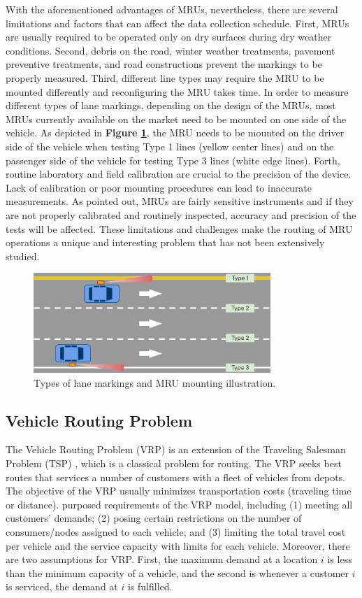 \documentclass[numbered]{trbunofficial}
\begin{document}
With the aforementioned advantages of MRUs, nevertheless, there are several limitations and factors that can affect the data collection schedule.  First, MRUs are usually required to be operated only on dry surfaces during dry weather conditions.  Second, debris on the road, winter weather treatments, pavement preventive treatments, and road constructions prevent the markings to be properly measured.  Third, different line types may require the MRU to be mounted differently and reconfiguring the MRU takes time.  In order to measure different types of lane markings, depending on the design of the MRUs, most MRUs currently available on the market need to be mounted on one side of the vehicle. As depicted in \textbf{Figure \ref{fig:1}}, the MRU needs to be mounted on the driver side of the vehicle when testing Type 1 lines (yellow center lines) and on the passenger side of the vehicle for testing Type 3 lines (white edge lines). Forth, routine laboratory and field calibration are crucial to the precision of the device.  Lack of calibration or poor mounting procedures can lead to inaccurate measurements. As \citep{Choubane2013} pointed out, MRUs are fairly sensitive instruments and if they are not properly calibrated and routinely inspected, accuracy and precision of the tests will be affected. These limitations and challenges make the routing of MRU operations a unique and interesting problem that has not been extensively studied.

\begin{figure}[!ht]
    \centering
    \includegraphics[width=0.8\textwidth]{figures/fig1.png}
    \caption{Types of lane markings and MRU mounting illustration.}
    \label{fig:1}
\end{figure}

\subsection{Vehicle Routing Problem}
The Vehicle Routing Problem (VRP) is an extension of the Traveling Salesman Problem (TSP) \cite{Dantzig2008}, which is a classical problem for routing. The VRP seeks best routes that services a number of customers with a fleet of vehicles from depots. The objective of the VRP usually minimizes transportation costs (traveling time or distance). \citep{Kulkarni1985} purposed requirements of the VRP model, including (1) meeting all customers' demands; (2) posing certain restrictions on the number of consumers/nodes assigned to each vehicle; and (3) limiting the total travel cost per vehicle and the service capacity with limits for each vehicle. Moreover, there are two assumptions for VRP. First, the maximum demand at a location $i$ is less than the minimum capacity of a vehicle, and the second is whenever a customer $i$ is serviced, the demand at $i$ is fulfilled.
\end{document}
